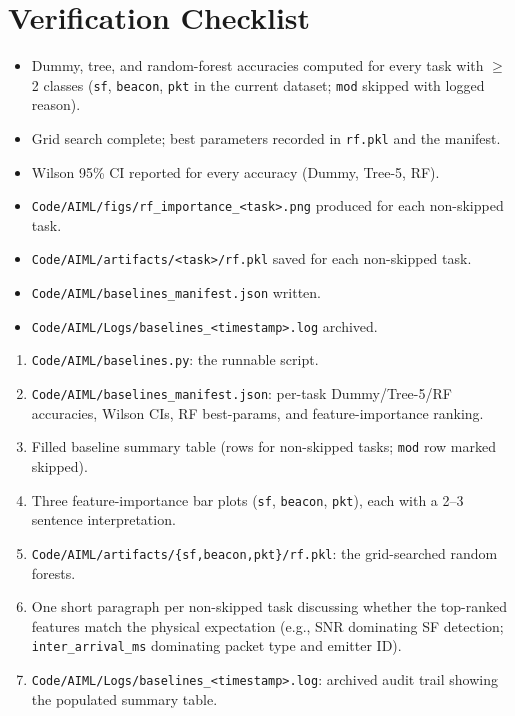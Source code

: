 \documentclass[11pt,letterpaper]{article}
\begin{document}
\section{Verification Checklist}
\begin{itemize}[leftmargin=2em]
	\item[$\square$] Dummy, tree, and random-forest accuracies computed for every task with $\geq$2 classes (\texttt{sf}, \texttt{beacon}, \texttt{pkt} in the current dataset; \texttt{mod} skipped with logged reason).
	\item[$\square$] Grid search complete; best parameters recorded in \texttt{rf.pkl} and the manifest.
	\item[$\square$] Wilson 95\% CI reported for every accuracy (Dummy, Tree-5, RF).
	\item[$\square$] \texttt{Code/AIML/figs/rf\_importance\_<task>.png} produced for each non-skipped task.
	\item[$\square$] \texttt{Code/AIML/artifacts/<task>/rf.pkl} saved for each non-skipped task.
	\item[$\square$] \texttt{Code/AIML/baselines\_manifest.json} written.
	\item[$\square$] \texttt{Code/AIML/Logs/baselines\_<timestamp>.log} archived.
\end{itemize}

\begin{tcolorbox}[deliverable={Lab Handout 4-C Deliverable}]
	\begin{enumerate}[leftmargin=1.2em]
		\item \texttt{Code/AIML/baselines.py}: the runnable script.
		\item \texttt{Code/AIML/baselines\_manifest.json}: per-task Dummy/Tree-5/RF accuracies, Wilson CIs, RF best-params, and feature-importance ranking.
		\item Filled baseline summary table (rows for non-skipped tasks; \texttt{mod} row marked skipped).
		\item Three feature-importance bar plots (\texttt{sf}, \texttt{beacon}, \texttt{pkt}), each with a 2--3 sentence interpretation.
		\item \texttt{Code/AIML/artifacts/\{sf,beacon,pkt\}/rf.pkl}: the grid-searched random forests.
		\item One short paragraph per non-skipped task discussing whether the top-ranked features match the physical expectation (e.g., \mbox{SNR} dominating SF detection; \texttt{inter\_arrival\_ms} dominating packet type and emitter \mbox{ID}).
		\item \texttt{Code/AIML/Logs/baselines\_<timestamp>.log}: archived audit trail showing the populated summary table.
	\end{enumerate}
\end{tcolorbox}

\printhandoutglossary
\end{document}
